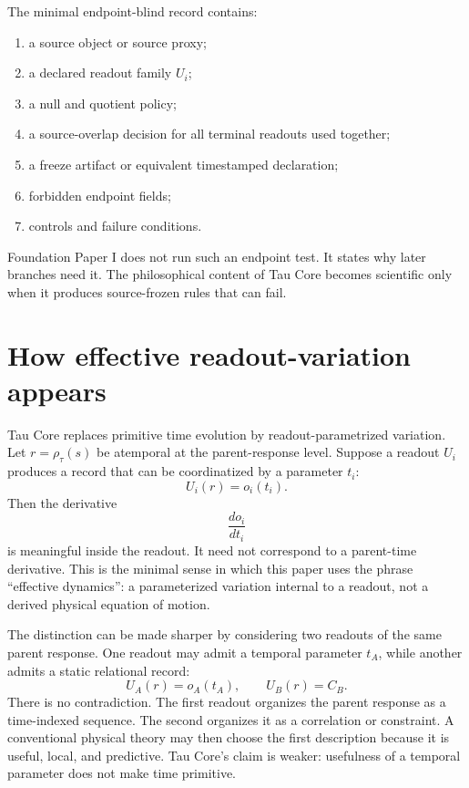 \documentclass[11pt]{article}
\newcommand{\Rmap}{\rho_{\tau}}
\begin{document}
The minimal endpoint-blind record contains:
\begin{enumerate}[label=(E\arabic*)]
  \item a source object or source proxy;
  \item a declared readout family \(U_i\);
  \item a null and quotient policy;
  \item a source-overlap decision for all terminal readouts used together;
  \item a freeze artifact or equivalent timestamped declaration;
  \item forbidden endpoint fields;
  \item controls and failure conditions.
\end{enumerate}

Foundation Paper I does not run such an endpoint test.  It states why later
branches need it.  The philosophical content of Tau Core becomes scientific
only when it produces source-frozen rules that can fail.

\section{How effective readout-variation appears}

Tau Core replaces primitive time evolution by readout-parametrized variation.
Let \(r=\Rmap(s)\) be atemporal at the parent-response level.  Suppose a
readout \(U_i\) produces a record that can be coordinatized by a parameter
\(t_i\):
\[
  U_i(r) = o_i(t_i).
\]
Then the derivative
\[
  \frac{d o_i}{dt_i}
\]
is meaningful inside the readout.  It need not correspond to a parent-time
derivative.  This is the minimal sense in which this paper uses the phrase
``effective dynamics'': a parameterized variation internal to a readout, not a
derived physical equation of motion.

The distinction can be made sharper by considering two readouts of the same
parent response.  One readout may admit a temporal parameter \(t_A\), while
another admits a static relational record:
\[
  U_A(r)=o_A(t_A), \qquad U_B(r)=C_B.
\]
There is no contradiction.  The first readout organizes the parent response as
a time-indexed sequence.  The second organizes it as a correlation or
constraint.  A conventional physical theory may then choose the first
description because it is useful, local, and predictive.  Tau Core's claim is
weaker: usefulness of a temporal parameter does not make time primitive.
\end{document}
